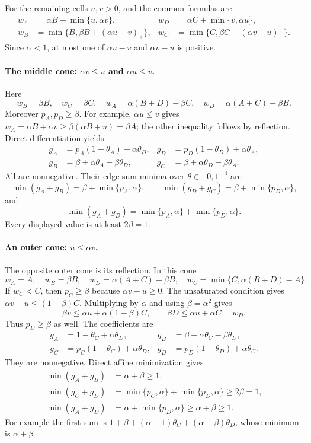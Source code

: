 \documentclass[11pt]{article}
\theoremstyle{definition}\newtheorem{definition}[theorem]{Definition}
\theoremstyle{remark}\newtheorem{remark}[theorem]{Remark}
\begin{document}
For the remaining cells $u,v>0$, and the common formulas are
\begin{align*}
 w_A&=\alpha B+\min\{u,\alpha v\},&
 w_D&=\alpha C+\min\{v,\alpha u\},\\
 w_B&=\min\{B,\beta B+(\alpha u-v)_+\},&
 w_C&=\min\{C,\beta C+(\alpha v-u)_+\}.
\end{align*}
Since $\alpha<1$, at most one of $\alpha u-v$ and $\alpha v-u$ is
positive.

\paragraph{The middle cone: $\alpha v\le u$ and $\alpha u\le v$.}
Here
\[
 w_B=\beta B,\quad w_C=\beta C,\quad
 w_A=\alpha(B+D)-\beta C,\quad w_D=\alpha(A+C)-\beta B.
\]
Moreover $p_A,p_D\ge\beta$. For example,
$\alpha u\le v$ gives
$w_A=\alpha B+\alpha v\ge\beta(\alpha B+u)=\beta A$;
the other inequality follows by reflection. Direct differentiation yields
\begin{align*}
 g_A&=p_A(1-\theta_A)+\alpha\theta_D,&
 g_D&=p_D(1-\theta_D)+\alpha\theta_A,\\
 g_B&=\beta+\alpha\theta_A-\beta\theta_D,&
 g_C&=\beta+\alpha\theta_D-\beta\theta_A.
\end{align*}
All are nonnegative. Their edge-sum minima over $\theta\in[0,1]^4$ are
\[
 \min(g_A+g_B)=\beta+\min\{p_A,\alpha\},\qquad
 \min(g_D+g_C)=\beta+\min\{p_D,\alpha\},
\]
and
\[
 \min(g_A+g_D)=\min\{p_A,\alpha\}+\min\{p_D,\alpha\}.
\]
Every displayed value is at least $2\beta=1$.

\paragraph{An outer cone: $u\le\alpha v$.}
The opposite outer cone is its reflection. In this cone
\[
 w_A=A,\quad w_B=\beta B,\quad
 w_D=\alpha(A+C)-\beta B,\quad
 w_C=\min\{C,\alpha(B+D)-A\}.
\]
If $w_C<C$, then $p_C\ge\beta$ because $\alpha v-u\ge0$.
The unsaturated condition gives
$\alpha v-u\le(1-\beta)C$. Multiplying by $\alpha$ and using
$\beta=\alpha^2$ gives
\[
 \beta v\le\alpha u+\alpha(1-\beta)C,
 \qquad \beta D\le\alpha u+\alpha C=w_D.
\]
Thus $p_D\ge\beta$ as well. The coefficients are
\begin{align*}
 g_A&=1-\theta_C+\alpha\theta_D,&
 g_B&=\beta+\alpha\theta_C-\beta\theta_D,\\
 g_C&=p_C(1-\theta_C)+\alpha\theta_D,&
 g_D&=p_D(1-\theta_D)+\alpha\theta_C.
\end{align*}
They are nonnegative. Direct affine minimization gives
\begin{align*}
 \min(g_A+g_B)&=\alpha+\beta\ge1,\\
 \min(g_C+g_D)&=\min\{p_C,\alpha\}+\min\{p_D,\alpha\}\ge2\beta=1,\\
 \min(g_A+g_D)&=\alpha+\min\{p_D,\alpha\}\ge\alpha+\beta\ge1.
\end{align*}
For example the first sum is
$1+\beta+(\alpha-1)\theta_C+(\alpha-\beta)\theta_D$, whose minimum
is $\alpha+\beta$.
\end{document}
